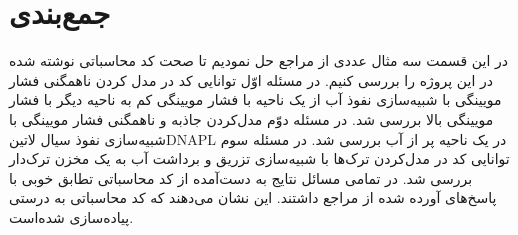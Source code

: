 \section{جمع‌بندی}
در این قسمت سه مثال عددی از مراجع \cite{vandujanal,vandujthes,basthabil,bastn,karimi1,hoteitf} حل نمودیم تا صحت کد محاسباتی نوشته شده در این پروژه را بررسی کنیم. در مسئله اوّل توانایی کد در مدل کردن ناهمگنی فشار مویینگی با شبیه‌سازی نفوذ آب از یک ناحیه با فشار مویینگی کم به ناحیه دیگر با فشار مویینگی بالا بررسی شد. در مسئله دوّم مدل‌کردن جاذبه و ناهمگنی فشار مویینگی با شبیه‌سازی نفوذ سیال \text‌لاتین{DNAPL} در یک ناحیه پر از آب بررسی شد. در مسئله سوم توانایی کد در مدل‌کردن ترک‌ها با شبیه‌سازی تزریق و برداشت آب به یک مخزن ترک‌دار بررسی شد. در تمامی مسائل نتایج به دست‌آمده از کد محاسباتی تطابق خوبی با پاسخ‌های آورده شده از مراجع داشتند. این نشان می‌دهند که کد محاسباتی به درستی پیاده‌سازی شده‌است.

